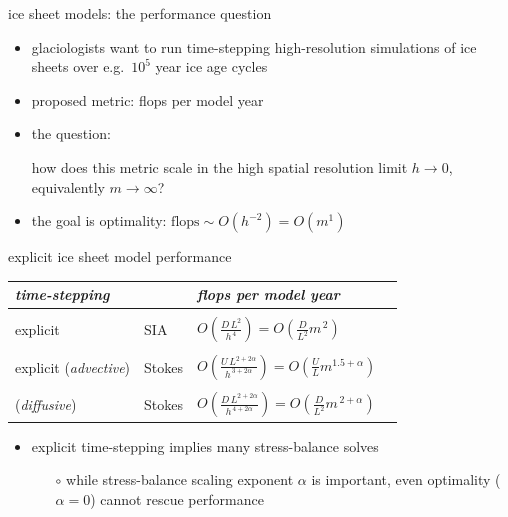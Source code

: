 \documentclass[svgnames,
               hyperref={colorlinks,citecolor=DeepPink4,linkcolor=FireBrick,urlcolor=Maroon},
               usepdftitle=false]  %
               {beamer}
\newcommand{\oo}[1]{\displaystyle O\left(#1\right)}
\begin{document}
\begin{frame}{ice sheet models: the performance question}

\begin{itemize}
\item glaciologists want to run time-stepping high-resolution simulations of ice sheets over e.g.~$10^5$ year ice age cycles

\bigskip
\item proposed metric: \quad \alert{flops per model year}

\bigskip
\item the question:

\bigskip
\begin{center}
\begin{minipage}{0.82\textwidth}
how does this metric \alert{scale} in the \alert{high spatial resolution limit} $h\to 0$, equivalently $m\to \infty$?
\end{minipage}
\end{center}

\bigskip
\item the goal is optimality: \hspace{20mm} $\text{flops} \sim O(h^{-2}) = O(m^1)$
\end{itemize}
\end{frame}


\begin{frame}{explicit ice sheet model performance}

\begin{tabular}{llll}
\emph{time-stepping} &  & \emph{flops per model year} \\ \hline
\\
explicit & SIA    & $\oo{\frac{D\, L^2}{h^{\,4}}} = \oo{\frac{D}{L^2} m^{\,2}}$ \\
\\
explicit ({\footnotesize \emph{advective}}) & Stokes \phantom{xxxx} & $\oo{\frac{U \,L^{2+2\alpha}}{h^{\,3+2\alpha}}} = \oo{\frac{U}{L} m^{1.5+\alpha}}$ \\
\\
\phantom{explicit} ({\footnotesize \emph{diffusive}})  & Stokes & $\oo{\frac{D\, L^{2+2\alpha}}{h^{\,4+2\alpha}}} = \oo{\frac{D}{L^2} m^{\,2+\alpha}}$
\end{tabular}


\vspace{10mm}
\begin{itemize}
\item explicit time-stepping implies \alert{many stress-balance solves}
    \begin{itemize}
    \item[$\circ$] while stress-balance scaling exponent $\alpha$ is important, even optimality ($\alpha=0$) cannot rescue performance
    \end{itemize}
\end{itemize}
\end{frame}
\end{document}
